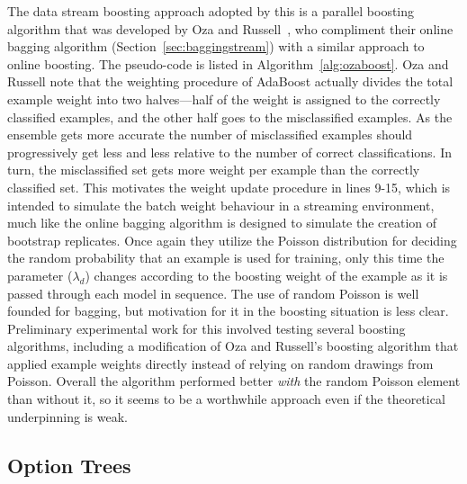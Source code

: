 The data stream boosting approach adopted by this \thesis  is a parallel boosting algorithm that was developed by Oza and Russell~\cite{ozabagboost}, who compliment their online bagging algorithm (Section~\ref{sec:baggingstream}) with a similar approach to online boosting. The pseudo-code is listed in Algorithm~\ref{alg:ozaboost}.
Oza and Russell note that the weighting procedure of AdaBoost actually divides the total example weight into two halves---half of the weight is assigned to the correctly classified examples, and the other half goes to the misclassified examples. As the ensemble gets more accurate the number of misclassified examples should progressively get less and less relative to the number of correct classifications. In turn, the misclassified set gets more weight per example than the correctly classified set. This motivates the weight update procedure in lines 9-15, which is intended to simulate the batch weight behaviour in a streaming environment, much like the online bagging algorithm is designed to simulate the creation of bootstrap replicates. Once again they utilize the Poisson distribution for deciding the random probability that an example is used for training, only this time the parameter ($\lambda_{d}$) changes according to the boosting weight of the example as it is passed through each model in sequence. The use of random Poisson is well founded for bagging, but motivation for it in the boosting situation is less clear. Preliminary experimental work for this \thesis  involved testing several boosting algorithms, including a modification of Oza and Russell's boosting algorithm that applied example weights directly instead of relying on random drawings from Poisson. Overall the algorithm performed better {\em with} the random Poisson element than without it, so it seems to be a worthwhile approach even if the theoretical underpinning is weak.



\subsection{Option Trees} 
\label{sec:hot}

